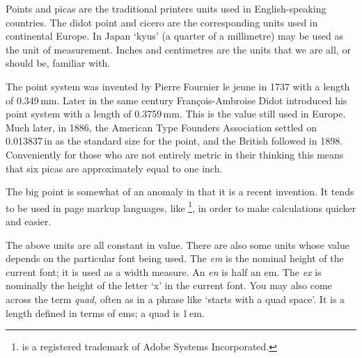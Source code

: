 \documentclass[10pt,a4paper,oneside,extrafontsizes]{memoir}%
\newcommand{\PWnote}[2]{}
\newcommand\U[2]{\textrm{#1}\,\textrm{#2}}
\begin{document}
\begin{paracol}{2}
\switchEng
    Points and picas 
are the traditional printers units used in English-speaking countries. 
The didot point and cicero are the 
corresponding units used in continental Europe. In Japan `kyus'
(a quarter of a millimetre) may be used as the unit of measurement.
Inches and centimetres are the units that we
are all, or should be, familiar with.

    The point system was invented by Pierre Fournier le jeune in 1737 with
a length of \U{0.349}{mm}. Later in the same century Fran\c{c}ois-Ambroise Didot
introduced his point system with a length of \U{0.3759}{mm}. This is the value
still used in Europe. Much later, in 1886, the American Type Founders
Association settled on \U{0.013837}{in} as the standard size for the point, and
the British followed in 1898. Conveniently for those who are not entirely
metric in their thinking this means that 
six picas are approximately equal to one inch.

    The big point 
is somewhat of an anomaly in that it is a recent
invention. It tends to be used
in page markup languages, like \pscript\footnote{\pscript{} is a 
registered trademark of Adobe Systems Incorporated.\label{fn:ps}},
in order to make calculations quicker and easier.

    The above units are all constant in value. There are also some units
whose value depends on the particular font being used. 
The \textit{em}
is the nominal height of the current font; it is used as a width measure.
An \textit{en} is half an em.
The \textit{ex} is
nominally the height of the letter `x' in the current font. You may also
come across the term \textit{quad}, often as in a phrase
like `starts with a quad space'. It is a length defined in terms of
ems; a quad is \U{1}{em}.
\end{paracol}

\cleardoublepage

\mainmatter



\PWnote{2009/02/02}{Added Historical background chapter}
\end{document}
